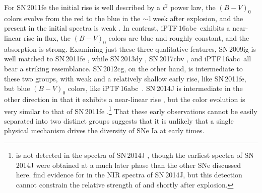 \documentclass[twocolumn]{aastex61}
\newcommand{\abc}{iPTF\,16abc}
\begin{document}
For SN\,2011fe the initial rise is well described by a $t^2$ power law, the
$(B - V)_0$ colors evolve from the red to the blue in the $\sim$1\,week
after explosion, and the  present in the initial spectra is weak
\citep{2011Natur.480..344N,2012ApJ...752L..26P,2016ApJ...820...67Z}. In
contrast, \abc\ exhibits a near-linear rise in flux, the $(B - V)_0$ colors
are blue and roughly constant, and the  absorption is strong.
Examining just these three qualitative features, SN\,2009ig is well matched
to SN\,2011fe \citep{2012ApJ...744...38F}, while SN\,2013dy
\citep{2013ApJ...778L..15Z}, SN\,2017cbv \citep{2017ApJ...845L..11H}, and
\abc\ all bear a striking resemblance. SN\,2012cg, on the other hand, is
intermediate to these two groups, with weak  and a relatively
shallow early rise, like SN\,2011fe, but blue $(B - V)_0$ colors, like \abc\
\citep{2012ApJ...756L...7S,2016ApJ...820...92M}. SN\,2014J is intermediate
in the other direction in that it exhibits a near-linear rise
\citep{2014ApJ...783L..24Z,2015ApJ...799..106G}, but the color evolution is
very similar to that of SN\,2011fe
\citep{2014ApJ...788L..21A}.\footnote{ is not detected in the
spectra of SN\,2014J \citep{2014ApJ...784L..12G,2014ApJ...783L..24Z}, though
the earliest spectra of SN\,2014J were obtained at a much later phase than
the other SNe discussed here. \citet{2015ApJ...798...39M} find evidence for
\ion{C}{1} in the NIR spectra of SN\,2014J, but this detection cannot
constrain the relative strength of \ion{C}{2} and \ion{Si}{2} shortly after
explosion.} That these early observations cannot be easily separated into
two distinct groups suggests that it is unlikely that a single physical
mechanism drives the diversity of SNe Ia at early times.
\end{document}
